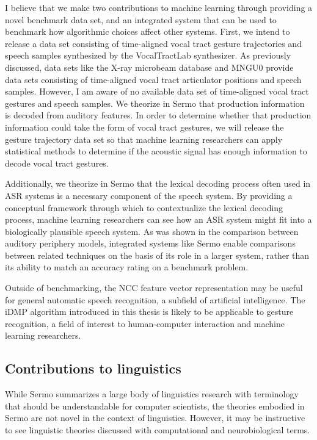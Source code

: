 I believe that we make two contributions
to machine learning through
providing a novel benchmark data set,
and an integrated system that can
be used to benchmark how algorithmic choices
affect other systems.
First, we intend to release a data set
consisting of time-aligned
vocal tract gesture trajectories
and speech samples synthesized
by the VocalTractLab synthesizer.
As previously discussed,
data sets like the
X-ray microbeam database \citep{westbury1990}
and MNGU0 \citep{steiner2012}
provide data sets
consisting of time-aligned
vocal tract articulator positions
and speech samples.
However, I am aware of no available data set
of time-aligned vocal tract gestures
and speech samples.
We theorize in Sermo
that production information
is decoded from auditory features.
In order to determine whether
that production information
could take the form of vocal tract gestures,
we will release the
gesture trajectory data set
so that machine learning researchers
can apply statistical methods
to determine if the acoustic signal
has enough information to decode
vocal tract gestures.

Additionally, we theorize in Sermo
that the lexical decoding process
often used in ASR systems
is a necessary component
of the speech system.
By providing a conceptual framework
through which to contextualize
the lexical decoding process,
machine learning researchers can
see how an ASR system might fit into
a biologically plausible speech system.
As was shown in the comparison
between auditory periphery models,
integrated systems like Sermo
enable comparisons between related techniques
on the basis of its role in a larger system,
rather than its ability to match
an accuracy rating on a benchmark problem.

Outside of benchmarking, the NCC
feature vector representation
may be useful for
general automatic speech recognition,
a subfield of artificial intelligence.
The iDMP algorithm
introduced in this thesis is likely to be
applicable to gesture recognition,
a field of interest to human-computer interaction
and machine learning researchers.

\subsection{Contributions to linguistics}

While Sermo summarizes a large body of
linguistics research with terminology
that should be understandable for
computer scientists,
the theories embodied in Sermo
are not novel in the context of linguistics.
However, it may be instructive to see
linguistic theories
discussed with computational
and neurobiological terms.

